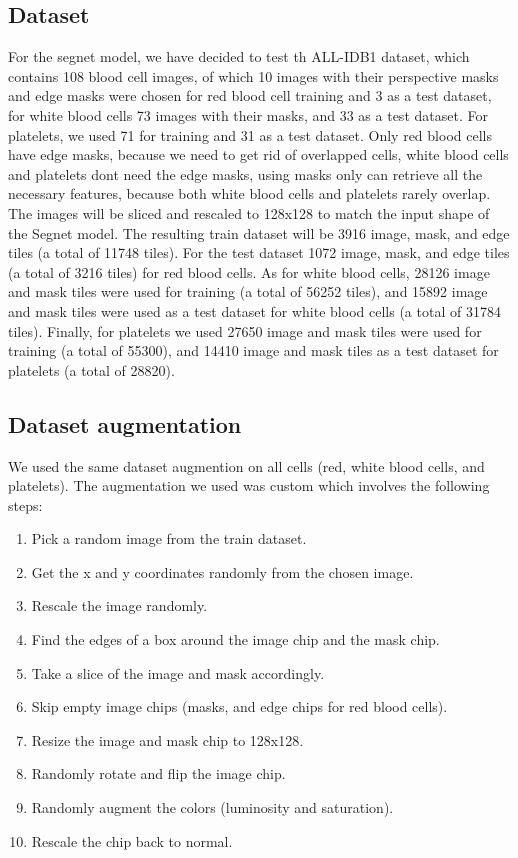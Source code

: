 \subsection{Dataset}
For the segnet model, we have decided to test th ALL-IDB1 dataset, which contains 108 blood cell images, of which 10 images with their perspective masks and edge masks were chosen for red blood cell training and 3 as a test dataset, for white blood cells 73 images with their masks, and 33 as a test dataset.
For platelets, we used 71 for training and 31 as a test dataset.
Only red blood cells have edge masks, because we need to get rid of overlapped cells, white blood cells and platelets dont need the edge masks, using masks only can retrieve all the necessary features, because both white blood cells and platelets rarely overlap.
The images will be sliced and rescaled to 128x128 to match the input shape of the Segnet model.
The resulting train dataset will be 3916 image, mask, and edge tiles (a total of 11748 tiles).
For the test dataset 1072 image, mask, and edge tiles (a total of 3216 tiles) for red blood cells.
As for white blood cells, 28126 image and mask tiles were used for training (a total of 56252 tiles), and 15892 image and mask tiles were used as a test dataset for white blood cells (a total of 31784 tiles).
Finally, for platelets we used 27650 image and mask tiles were used for training (a total of 55300), and 14410 image and mask tiles as a test dataset for platelets (a total of 28820).

\vspace{0.1in}



\subsection{Dataset augmentation}
We used the same dataset augmention on all cells (red, white blood cells, and platelets).
The augmentation we used was custom which involves the following steps:
\begin{enumerate}
    \item Pick a random image from the train dataset.
    \item Get the x and y coordinates randomly from the chosen image.
    \item Rescale the image randomly.
    \item Find the edges of a box around the image chip and the mask chip.
    \item Take a slice of the image and mask accordingly.
    \item Skip empty image chips (masks, and edge chips for red blood cells).
    \item Resize the image and mask chip to 128x128.
    \item Randomly rotate and flip the image chip.
    \item Randomly augment the colors (luminosity and saturation).
    \item Rescale the chip back to normal.
\end{enumerate}

